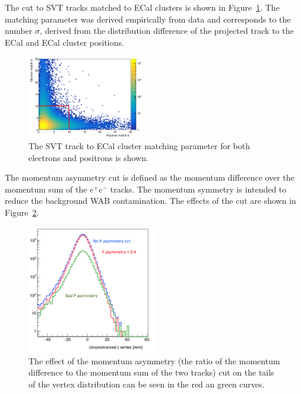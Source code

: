 The cut to SVT tracks matched to ECal clusters is shown in Figure~\ref{fig:matchcut}. The matching parameter was derived empirically from data and corresponds to the number $\sigma$, derived from the distribution difference of the projected track to the ECal and ECal cluster positions. 

\begin{figure}[H]
  \centering
      \includegraphics[width=0.45\textwidth]{pics/searching/matchcut.png}
  \caption[Cut on the track-cluster matching]{The SVT track to ECal cluster matching parameter for both electrons and positrons is shown.}
  \label{fig:matchcut}
\end{figure}

The momentum asymmetry cut is defined as the momentum difference over the momentum sum of the $e^+e^-$ tracks. The momentum symmetry is intended to reduce the background WAB contamination. The effects of the cut are shown in Figure~\ref{fig:pasycut}.

\begin{figure}[H]
  \centering
      \includegraphics[width=0.5\textwidth]{pics/searching/pasycut.png}
  \caption[Cut on the momentum asymmetry]{The effect of the momentum asymmetry (the ratio of the momentum difference to the momentum sum of the two tracks) cut on the tails of the vertex distribution can be seen in the red an green curves.}
  \label{fig:pasycut}
\end{figure} 


